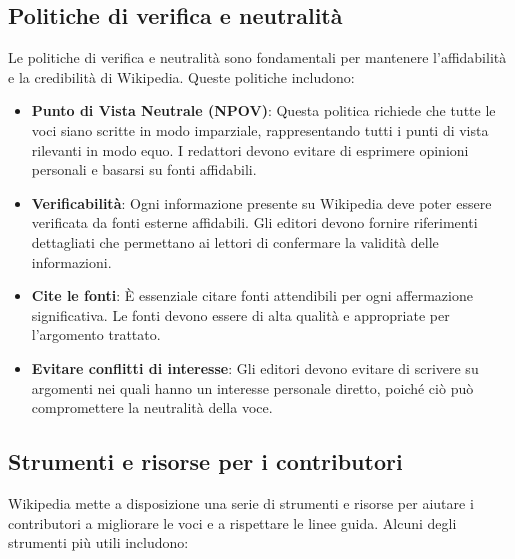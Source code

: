 \documentclass[12pt,a4paper]{report}
\begin{document}
\subsection{Politiche di verifica e neutralità}

Le politiche di verifica e neutralità sono fondamentali per mantenere l'affidabilità e la credibilità di Wikipedia. Queste politiche includono:

\begin{itemize}
    \item \textbf{Punto di Vista Neutrale (NPOV)}: Questa politica richiede che tutte le voci siano scritte in modo imparziale, rappresentando tutti i punti di vista rilevanti in modo equo. I redattori devono evitare di esprimere opinioni personali e basarsi su fonti affidabili.
    \item \textbf{Verificabilità}: Ogni informazione presente su Wikipedia deve poter essere verificata da fonti esterne affidabili. Gli editori devono fornire riferimenti dettagliati che permettano ai lettori di confermare la validità delle informazioni.
    \item \textbf{Cite le fonti}: È essenziale citare fonti attendibili per ogni affermazione significativa. Le fonti devono essere di alta qualità e appropriate per l'argomento trattato.
    \item \textbf{Evitare conflitti di interesse}: Gli editori devono evitare di scrivere su argomenti nei quali hanno un interesse personale diretto, poiché ciò può compromettere la neutralità della voce.
\end{itemize}

\subsection{Strumenti e risorse per i contributori}

Wikipedia mette a disposizione una serie di strumenti e risorse per aiutare i contributori a migliorare le voci e a rispettare le linee guida. Alcuni degli strumenti più utili includono:
\end{document}
